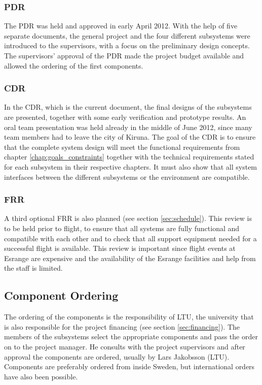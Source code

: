 \subsubsection*{\acl{PDR}}

The \ac{PDR} was held and approved in early April 2012. With the help of five separate documents, the general project and the four different subsystems were introduced to the supervisors, with a focus on the preliminary design concepts. The supervisors' approval of the \ac{PDR} made the project budget available and allowed the ordering of the first components.
%
\subsubsection*{\acl{CDR}}

In the \ac{CDR}, which is the current document, the final designs of the subsystems are presented, together with some early verification and prototype results. An oral team presentation was held already in the middle of June 2012, since many team members had to leave the city of Kiruna. The goal of the \ac{CDR} is to ensure that the complete system design will meet the functional requirements from chapter \ref{chap:goals_constraints} together with the technical requirements stated for each subsystem in their respective chapters. It must also show that all system interfaces between the different subsystems or the environment are compatible.
%
\subsubsection*{\acl{FRR}}
A third optional \ac{FRR} is also planned (see section \ref{sec:schedule}). This review is to be held prior to flight, to ensure that all systems are fully functional and compatible with each other and to check that all support equipment needed for a successful flight is available. This review is important since flight events at Esrange are expensive and the availability of the Esrange facilities and help from the staff is limited.
%
%
\subsection{Component Ordering}
%
The ordering of the components is the responsibility of \ac{LTU}, the university that is also responsible for the project financing (see section \ref{sec:financing}). The members of the subsystems select the appropriate components and pass the order on to the project manager. He consults with the project supervisors and after approval the components are ordered, usually by Lars Jakobsson (\ac{LTU}). Components are preferably ordered from inside Sweden, but international orders have also been possible.
%
